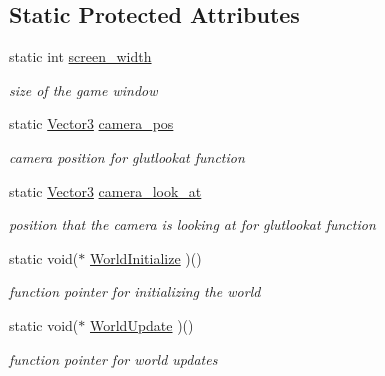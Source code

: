 \subsection*{Static Protected Attributes}
\begin{CompactItemize}
\item 
\hypertarget{class_graphics_b568c4125db20491bcad23c0b2de11b5}{
static int \hyperlink{class_graphics_b568c4125db20491bcad23c0b2de11b5}{screen\_\-width}}
\label{class_graphics_b568c4125db20491bcad23c0b2de11b5}

\begin{CompactList}\small\item\em size of the game window \item\end{CompactList}\item 
\hypertarget{class_graphics_c6c2c74b4fdc1aedb2c4ede598737f53}{
static \hyperlink{class_vector3}{Vector3} \hyperlink{class_graphics_c6c2c74b4fdc1aedb2c4ede598737f53}{camera\_\-pos}}
\label{class_graphics_c6c2c74b4fdc1aedb2c4ede598737f53}

\begin{CompactList}\small\item\em camera position for glutlookat function \item\end{CompactList}\item 
\hypertarget{class_graphics_c95004a70fc6f64464e166fcd8923c73}{
static \hyperlink{class_vector3}{Vector3} \hyperlink{class_graphics_c95004a70fc6f64464e166fcd8923c73}{camera\_\-look\_\-at}}
\label{class_graphics_c95004a70fc6f64464e166fcd8923c73}

\begin{CompactList}\small\item\em position that the camera is looking at for glutlookat function \item\end{CompactList}\item 
\hypertarget{class_graphics_31e8d572c5a98b83ecc4ada2caf819bf}{
static void($\ast$ \hyperlink{class_graphics_31e8d572c5a98b83ecc4ada2caf819bf}{WorldInitialize} )()}
\label{class_graphics_31e8d572c5a98b83ecc4ada2caf819bf}

\begin{CompactList}\small\item\em function pointer for initializing the world \item\end{CompactList}\item 
\hypertarget{class_graphics_86313ffa3abc05e64939da94c4f54ca7}{
static void($\ast$ \hyperlink{class_graphics_86313ffa3abc05e64939da94c4f54ca7}{WorldUpdate} )()}
\label{class_graphics_86313ffa3abc05e64939da94c4f54ca7}

\begin{CompactList}\small\item\em function pointer for world updates \item\end{CompactList}\end{CompactItemize}


